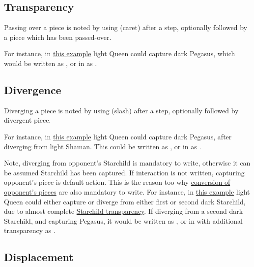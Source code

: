 \subsection*{Transparency}
\label{sec:Appendix/Notation/Transparency}

Passing over a piece is noted by using \alg{\^{}} (caret) after a step,
optionally followed by a piece which has been passed-over.

For instance, in \hyperref[fig:scn_mv_011_wave_is_transparent]{this example} light
Queen could capture dark Pegasus, which would be written as\newline
{}, or in  as\newline
{}.

\subsection*{Divergence}
\label{sec:Appendix/Notation/Divergence}

Diverging a piece is noted by using \alg{/} (slash) after a step, optionally followed
by divergent piece.

For instance, in \hyperref[fig:scn_cot_030_own_shaman_is_divergent_init]{this example}
light Queen could capture dark Pegasus, after diverging from light Shaman.
This could be written as , or in  as .

Note, diverging from opponent's Starchild is mandatory to write, otherwise it
can be assumed Starchild has been captured. If interaction is not written,
capturing opponent's piece is default action. This is the reason too why
\hyperref[sec:Appendix/Notation/Conversion]{conversion of opponent's pieces}
are also mandatory to write.\newline
\indent
For instance, in
\hyperref[fig:scn_o_30_starchild_divergence_init]{this example} light Queen
could either capture or diverge from either first or second dark Starchild,
due to almost complete
\hyperref[fig:scn_o_15_starchild_is_transparent]{Starchild transparency}.
If diverging from a second dark Starchild, and capturing Pegasus, it would
be written as , or in  with additional transparency
as .

\subsection*{Displacement}
\label{sec:Appendix/Notation/Displacement}

